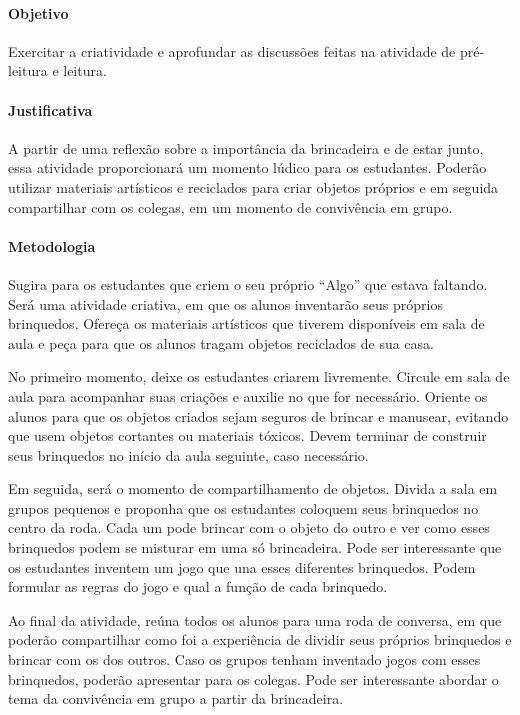 \documentclass[11pt]{extarticle}
\begin{document}
\paragraph{Objetivo} Exercitar a criatividade e aprofundar as discussões feitas na atividade de pré-leitura e leitura.

\paragraph{Justificativa} A partir de uma reflexão sobre a importância da brincadeira e de estar junto, essa atividade proporcionará um momento lúdico para os estudantes. Poderão utilizar materiais artísticos e reciclados para criar objetos próprios e em seguida compartilhar com os colegas, em um momento de convivência em grupo.

\paragraph{Metodologia} Sugira para os estudantes que criem o seu próprio ``Algo'' que estava faltando. Será uma atividade criativa, em que os alunos inventarão seus próprios brinquedos. Ofereça os materiais artísticos que tiverem disponíveis em sala de aula e peça para que os alunos tragam objetos reciclados de sua casa.


No primeiro momento, deixe os estudantes criarem livremente. Circule em sala de aula para acompanhar suas criações e auxilie no que for necessário. Oriente os alunos para que os objetos criados sejam seguros de brincar e manusear, evitando que usem objetos cortantes ou materiais tóxicos. Devem terminar de construir seus brinquedos no início da aula seguinte, caso necessário.

Em seguida, será o momento de compartilhamento de objetos. Divida a sala em grupos pequenos e proponha que os estudantes coloquem seus brinquedos no centro da roda. Cada um pode brincar com o objeto do outro e ver como esses brinquedos podem se misturar em uma só brincadeira. Pode ser interessante que os estudantes inventem um jogo que una esses diferentes brinquedos. Podem formular as regras do jogo e qual a função de cada brinquedo.

Ao final da atividade, reúna todos os alunos para uma roda de conversa, em que poderão compartilhar como foi a experiência de dividir seus próprios brinquedos e brincar com os dos outros. Caso os grupos tenham inventado jogos com esses brinquedos, poderão apresentar para os colegas. Pode ser interessante abordar o tema da convivência em grupo a partir da brincadeira.
\end{document}
